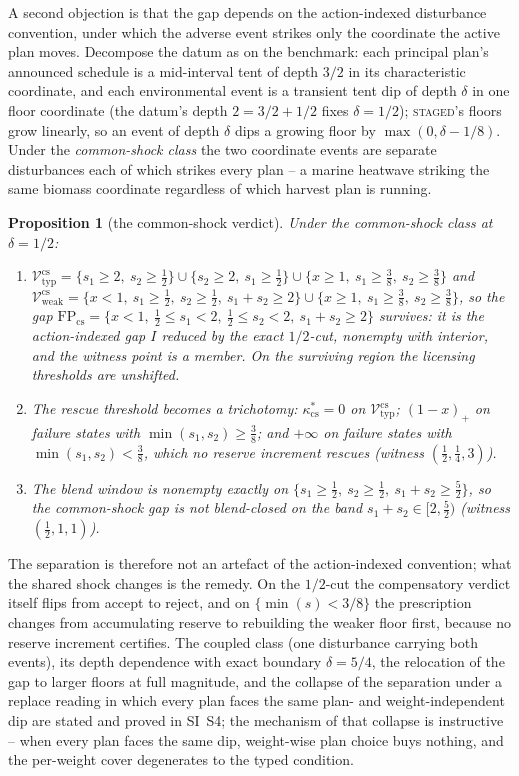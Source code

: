 \documentclass[preprint,11pt,authoryear]{elsarticle}
\newtheorem{proposition}{Proposition}
\theoremstyle{definition}
\theoremstyle{remark}
\newcommand{\Vtyp}{\mathcal{V}_{\mathrm{typ}}}
\newcommand{\Vweak}{\mathcal{V}_{\mathrm{weak}}}
\newcommand{\act}[1]{\textsc{#1}}
\begin{document}
A second objection is that the gap depends on the action-indexed disturbance convention, under which the adverse event strikes only the coordinate the active plan moves. Decompose the datum as on the benchmark: each principal plan's announced schedule is a mid-interval tent of depth $3/2$ in its characteristic coordinate, and each environmental event is a transient tent dip of depth $\delta$ in one floor coordinate (the datum's depth $2=3/2+1/2$ fixes $\delta=1/2$); \act{staged}'s floors grow linearly, so an event of depth $\delta$ dips a growing floor by $\max(0,\delta-1/8)$. Under the \emph{common-shock class} the two coordinate events are separate disturbances each of which strikes every plan -- a marine heatwave striking the same biomass coordinate regardless of which harvest plan is running.

\begin{proposition}[the common-shock verdict]\label{prop:commonshock}
Under the common-shock class at $\delta=1/2$:
\begin{enumerate}[label=\textup{(\roman*)},leftmargin=2em]
\item $\Vtyp^{\mathrm{cs}}=\{s_1\ge2,\ s_2\ge\tfrac12\}\cup\{s_2\ge2,\ s_1\ge\tfrac12\}\cup\{x\ge1,\ s_1\ge\tfrac38,\ s_2\ge\tfrac38\}$ and
$\Vweak^{\mathrm{cs}}=\{x<1,\ s_1\ge\tfrac12,\ s_2\ge\tfrac12,\ s_1+s_2\ge2\}\cup\{x\ge1,\ s_1\ge\tfrac38,\ s_2\ge\tfrac38\}$, so the gap
$\mathrm{FP}_{\mathrm{cs}}=\{x<1,\ \tfrac12\le s_1<2,\ \tfrac12\le s_2<2,\ s_1+s_2\ge2\}$
survives: it is the action-indexed gap $I$ reduced by the exact $1/2$-cut, nonempty with interior, and the witness point is a member. On the surviving region the licensing thresholds are unshifted.
\item The rescue threshold becomes a trichotomy: $\kappa^*_{\mathrm{cs}}=0$ on $\Vtyp^{\mathrm{cs}}$; $(1-x)_+$ on failure states with $\min(s_1,s_2)\ge\tfrac38$; and $+\infty$ on failure states with $\min(s_1,s_2)<\tfrac38$, which no reserve increment rescues (witness $(\tfrac12,\tfrac14,3)$).
\item The blend window is nonempty exactly on $\{s_1\ge\tfrac12,\ s_2\ge\tfrac12,\ s_1+s_2\ge\tfrac52\}$, so the common-shock gap is not blend-closed on the band $s_1+s_2\in[2,\tfrac52)$ (witness $(\tfrac12,1,1)$).
\end{enumerate}
\end{proposition}

The separation is therefore not an artefact of the action-indexed convention; what the shared shock changes is the remedy. On the $1/2$-cut the compensatory verdict itself flips from accept to reject, and on $\{\min(s)<3/8\}$ the prescription changes from accumulating reserve to rebuilding the weaker floor first, because no reserve increment certifies. The coupled class (one disturbance carrying both events), its depth dependence with exact boundary $\delta=5/4$, the relocation of the gap to larger floors at full magnitude, and the collapse of the separation under a replace reading in which every plan faces the same plan- and weight-independent dip are stated and proved in SI~S4; the mechanism of that collapse is instructive -- when every plan faces the same dip, weight-wise plan choice buys nothing, and the per-weight cover degenerates to the typed condition.
\end{document}
